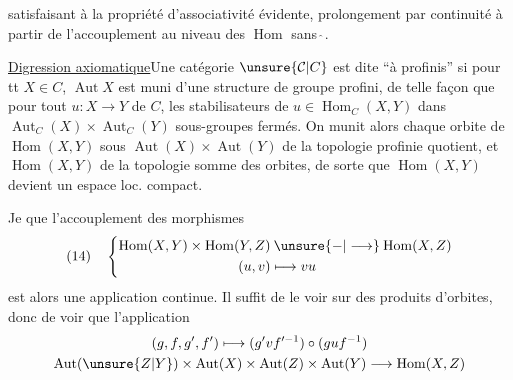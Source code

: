 satisfaisant à la propriété d'associativité évidente,  prolongement par continuité à partir de l'accouplement au niveau des $\operatorname{Hom}$ sans $\hat{\ }$. 

\uline{Digression axiomatique}\quad Une catégorie $\unsure{\mathcal{C}|C}$ est dite   ``à   profinis'' si pour tt $X\in C$, $\operatorname{Aut}X$ est muni d'une structure de groupe profini, de telle façon que pour tout $u:X\longrightarrow Y$ de $C$, les stabilisateurs de $u\in\operatorname{Hom}_C(X,Y)$ dans $\operatorname{Aut}_C(X)\times\operatorname{Aut}_C(Y)$    sous-groupes fermés.  On munit alors chaque orbite de $\operatorname{Hom}(X,Y)$ sous $\operatorname{Aut}(X)\times\operatorname{Aut}(Y)$ de la topologie profinie quotient, et $\operatorname{Hom}(X,Y)$ de la topologie  somme des orbites, de sorte que $\operatorname{Hom}(X,Y)$ devient un espace loc. compact.

Je   que l'accouplement des morphismes
\[
(14)\quad\left\{
\begin{aligned}
\operatorname{Hom}(X,Y)\times\operatorname{Hom}(Y,Z)&\mathbin{\unsure{-|\longrightarrow}}\operatorname{Hom}(X,Z)\\
(u,v)&\longmapsto vu
\end{aligned}\right.
\]
est alors  une  application continue. Il suffit de le voir sur des produits d'orbites, donc de voir que  l'application
\[
\begin{gathered}
(g,f,g',f')\longmapsto(g'vf'^{-1})\circ(guf^{-1})\\
\operatorname{Aut}(\unsure{Z|Y})\times\operatorname{Aut}(X)\times\operatorname{Aut}(Z)\times\operatorname{Aut}(Y)\longrightarrow\operatorname{Hom}(X,Z)
\end{gathered}
\]
